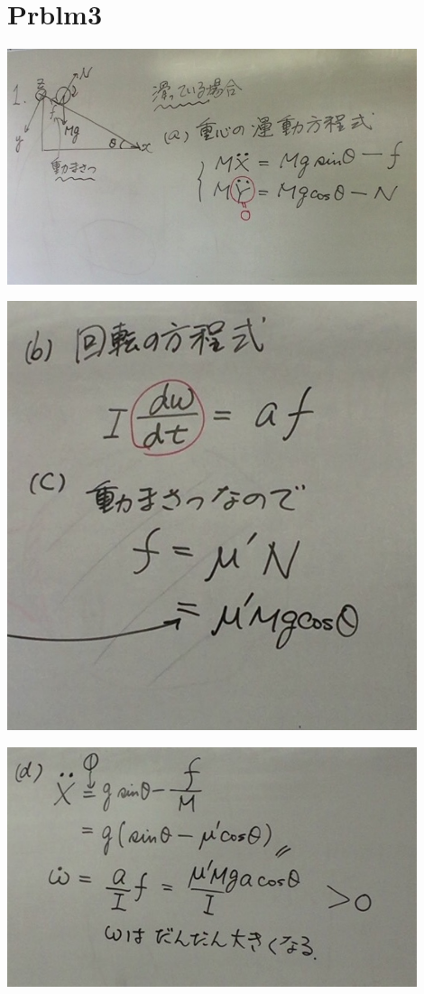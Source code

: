 \documentclass{jsarticle}
\begin{document}
\section{Prblm3}
	\begin{center}
		\includegraphics[width=12cm]{5_27_1.JPG}
	\end{center}
	\begin{center}
		\includegraphics[width=12cm]{5_27_2.JPG}
	\end{center}
	\begin{center}
		\includegraphics[width=12cm]{5_27_3.JPG}
	\end{center}
\end{document}
